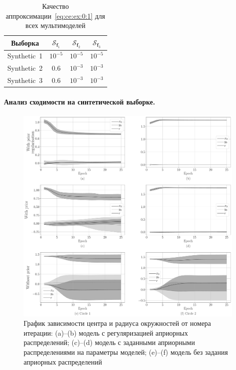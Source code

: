 \documentclass[12pt, twoside]{article}
\numberwithin{equation}{section}
\begin{document}
\begin{table}[h!t]
\begin{center}
\caption{Качество аппроксимации~\eqref{eq:ce:ex:0:1} для всех мультимоделей}
\label{tb:ce:1}
\begin{tabular}{|c|c|c|c|}
\hline
	Выборка & $\mathcal{S}_{\textbf{f}_1}$ & $\mathcal{S}_{\textbf{f}_2} $& $\mathcal{S}_{\textbf{f}_3} $\\
	\hline
	\multicolumn{1}{|l|}{Synthetic~1}
	& $10^{-5}$& $10^{-5}$& $10^{-5}$\\
	\hline
	\multicolumn{1}{|l|}{Synthetic~2}
	& $0.6$& $10^{-3}$& $10^{-3}$\\
	\hline
	\multicolumn{1}{|l|}{Synthetic~3}
	& $0.6$& $10^{-3}$& $10^{-3}$\\
\hline
\end{tabular}
\end{center}
\end{table}

\paragraph{Анализ сходимости на синтетической выборке.}
\begin{figure}[h!t]\center
\includegraphics[width=1\textwidth]{result_eng/experiment_synthetic_param_progress}
\caption{График зависимости центра и радиуса окружностей от номера итерации: (a)--(b) модель с регуляризацией априорных распределений; (c)--(d) модель с заданными априорными распределениями на параметры моделей; (e)--(f) модель без задания априорных распределений}
\label{experiment:st:2:1}
\end{figure}
\end{document}
